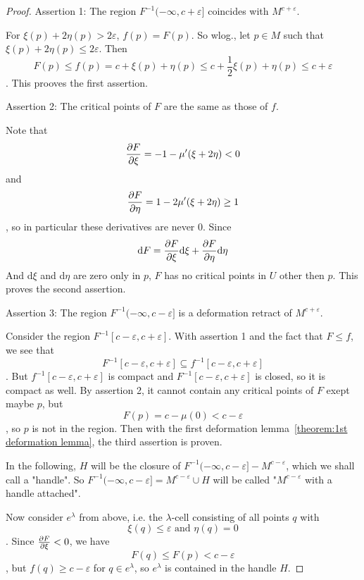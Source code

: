 \begin{proof}
   Assertion 1: The region $F^{-1}(-\infty, c + \varepsilon]$ coincides with 
   $M^{c + \varepsilon}$.

   For $\xi(p) + 2 \eta(p) > 2 \varepsilon$, $f(p) = F(p)$. So wlog., 
   let $p \in M$ such that $\xi(p) + 2 \eta(p) \leq 2 \varepsilon$. Then 
   \[ F(p) \leq f(p) = c + \xi(p) + \eta(p) 
   \leq c + \frac{1}{2} \xi(p) + \eta(p) 
   \leq c + \varepsilon \]. 
   This prooves the first assertion.

   Assertion 2: The critical points of $F$ are the same as those of $f$.

   Note that 
   \[ \pderive[F]{\xi} = -1 - \mu'(\xi + 2 \eta) < 0\]
   and
   \[ \pderive[F]{\eta} = 1 - 2 \mu'(\xi + 2 \eta) \geq 1 \]
   , so in particular these derivatives are never $0$. Since 
   \[ \text{d}F = \pderive[F]{\xi}\text{d}\xi + \pderive[F]{\eta} \text{d}\eta \]
   And d$\xi$ and d$\eta$ are zero only in $p$, $F$ has no critical points
   in $U$ other then $p$. This proves the second assertion.

   Assertion 3: The region $F^{-1}(-\infty, c - \varepsilon]$ is a deformation 
   retract of $M^{c + \varepsilon}$.

   Consider the region $F^{-1}[c - \varepsilon, c + \varepsilon]$. With 
   assertion 1 and the fact that $F \leq f$, we see that
   \[ F^{-1}[c - \varepsilon, c + \varepsilon] \subseteq f^{-1}[c - \varepsilon, c + \varepsilon] \] .
   But $f^{-1}[c - \varepsilon, c + \varepsilon]$ is compact and 
   $F^{-1}[c - \varepsilon, c + \varepsilon]$ is closed, so it is compact as 
   well. By assertion 2, it cannot contain any critical points of $F$ exept 
   maybe $p$, but
   \[ F(p) = c - \mu(0) < c - \varepsilon \],
   so $p$ is not in the region. Then with the first deformation 
   lemma~\ref{theorem:1st deformation lemma}, the third assertion is proven.
   
   In the following, $H$ will be the closure of 
   $F^{-1}(- \infty, c - \varepsilon] - M^{c - \varepsilon}$, which we shall 
   call a "handle". So $F^{-1}(- \infty, c - \varepsilon] = M^{c - \varepsilon} \cup H$
   will be called "$M^{c - \varepsilon}$ with a handle attached".

   Now consider $e^{\lambda}$ from above, i.e. the $\lambda$-cell consisting of
   all points $q$ with
   \[ \xi(q) \leq \varepsilon \text{ and } \eta(q) = 0 \].
   Since $\pderive[F]{\xi} < 0$, we have
   \[ F(q) \leq F(p) < c - \varepsilon \],
   but $f(q) \geq c - \varepsilon$ for $q \in e^{\lambda}$, so $e^{\lambda}$ 
   is contained in the handle $H$.


\end{proof}
